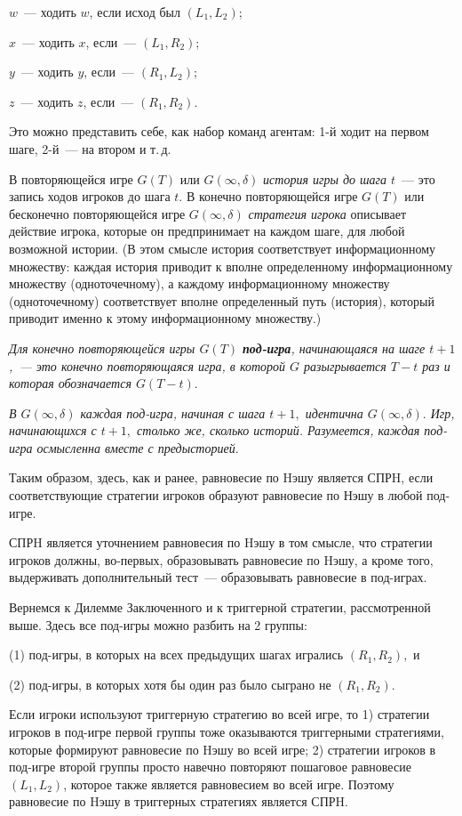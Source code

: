 $w$~--- ходить $w$, если исход был $(L_1,L_2)$;

$x$~--- ходить $x$, если~--- $(L_1,R_2)$;

$y$~--- ходить $y$, если~--- $(R_1,L_2)$;

$z$~--- ходить $z$, если~--- $(R_1,R_2)$.

Это можно представить себе, как набор команд агентам: 1-й ходит на первом
шаге, 2-й~--- на втором и т.\,д.

В повторяющейся игре $G(T)$ или $G(\infty,\delta)$ {\it история
игры до шага $t$}~--- это запись ходов игроков до шага $t$. В
конечно повторяющейся игре $G(T)$ или бесконечно повторяющейся игре
$G(\infty,\delta)$ {\it стратегия игрока} описывает действие игрока,
которые он предпринимает на каждом шаге, для любой возможной истории.
(В этом смысле история соответствует информационному множеству:
каждая история приводит к вполне определенному информационному
множеству (одноточечному), а каждому информационному множеству
(одноточечному) соответствует вполне определенный путь (история),
который  приводит именно к этому информационному множеству.)

{\it Для конечно повторяющейся игры $G(T)$ {\bf под-игра},
начинающаяся на шаге $t+1$,~--- это конечно повторяющаяся игра, в
которой $G$ разыгрывается $T-t$ раз и которая обозначается $G(T-
t)$}.

{\it В $G(\infty,\delta)$ каждая под-игра, начиная с шага $t+1,$
идентична $G(\infty,\delta).$ Игр, начинающихся с $t+1,$ столько же,
сколько историй.  Разумеется, каждая под-игра осмысленна вместе с
предысторией}.

Таким образом, здесь, как и ранее, равновесие по Hэшу является СПРH,
если соответствующие стратегии игроков образуют равновесие по Нэшу в
любой под-игре.

СПРH является уточнением равновесия по Hэшу в том смысле, что
стратегии игроков должны, во-первых, образовывать равновесие по Hэшу,
а кроме того, выдерживать дополнительный тест~--- образовывать равновесие
в под-играх.

Вернемся к Дилемме Заключенного и к триггерной стратегии,
рассмотренной выше. Здесь все под-игры можно разбить на 2 группы:

(1) под-игры, в которых на всех предыдущих шагах игрались
$(R_1,R_2),$ и

(2) под-игры, в которых хотя бы один раз было сыграно не
$(R_1,R_2).$

Если игроки используют триггерную стратегию во всей игре, то 1)
стратегии игроков в под-игре первой группы тоже оказываются
триггерными стратегиями, которые формируют равновесие по Hэшу во
всей игре; 2) стратегии игроков в под-игре второй группы просто
навечно повторяют пошаговое равновесие $(L_1,L_2)$, которое также
является равновесием во всей игре. Поэтому равновесие по Hэшу в
триггерных стратегиях является СПРH.

